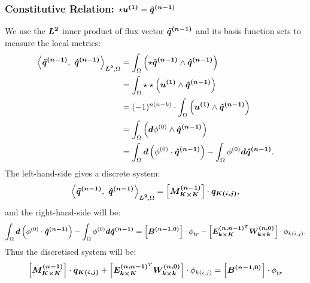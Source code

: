 \subsubsection{Constitutive Relation: $\star\boldsymbol{u^{(1)}} = \boldsymbol{\tilde{q}^{(n-1)}}$}
We use the $\boldsymbol{L^2}$ inner product of flux vector $\boldsymbol{\tilde{q}^{(n-1)}}$ and its basis function sets to measure the local metrics:
\begin{subequations}
\begin{align}
	\left<\vect{\tilde{q}^{(n-1)}},\ \vect{\hat{q}^{(n-1)}}  \right>_{\vect{L^2}, \Omega} &= \int_{\Omega} \left(\star\vect{\tilde{q}^{(n-1)}} \wedge \vect{\hat{q}^{(n-1)}}  \right) \\
	&= \int_{\Omega} \star\star \left(\vect{{u}^{(1)}} \wedge \vect{\hat{q}^{(n-1)}}  \right) \\
	&= (-1)^{n(n-k)}\cdot \int_{\Omega} \left(\vect{{u}^{(1)}} \wedge \vect{\hat{q}^{(n-1)}}  \right) \\
	&= \int_{\Omega} \left(\vect{d}\phi^{(0)} \wedge \vect{\hat{q}^{(n-1)}}  \right) \\
	&= \int_{\Omega} \vect{d}\left(\phi^{(0)} \cdot \vect{\hat{q}^{(n-1)}}  \right) - \int_{\Omega} \phi^{(0)} \vect{d\hat{q}^{(n-1)}}  . 
\end{align}
\end{subequations}
The left-hand-side gives a discrete system:
\begin{equation}
	\left<\vect{\tilde{q}^{(n-1)}},\ \vect{\hat{q}^{(n-1)}}  \right>_{\vect{L^2}, \Omega} = \left[\vect{M^{(n-1)}_{K\times K}} \right]\cdot \vect{q_{K(i,j)}}, 
\end{equation}
and the right-hand-side will be:
\begin{equation}
	\int_{\Omega} \boldsymbol{d}\left(\phi^{(0)} \cdot \boldsymbol{\hat{q}^{(n-1)}}  \right) - \int_{\Omega} \phi^{(0)} \boldsymbol{d\hat{q}^{(n-1)}} = \left[\boldsymbol{B^{(n-1,0)}} \right]\cdot \phi^{}_{tr} - \left[\boldsymbol{E^{(n,n-1)^T}_{k\times K}} \boldsymbol{W^{(n,0)}_{k\times k}}\right]\cdot \phi_{k(i,j)}. 
\end{equation}
Thus the discretised system will be: 
\begin{equation}
	\left[\boldsymbol{M^{(n-1)}_{K\times K}} \right]\cdot \boldsymbol{q_{K(i,j)}} + \left[\boldsymbol{E^{(n,n-1)^T}_{k\times K}} \boldsymbol{W^{(n,0)}_{k\times k}}\right]\cdot \phi_{k(i,j)} = \left[\boldsymbol{B^{(n-1,0)}} \right]\cdot \phi^{}_{tr} 
\end{equation}

